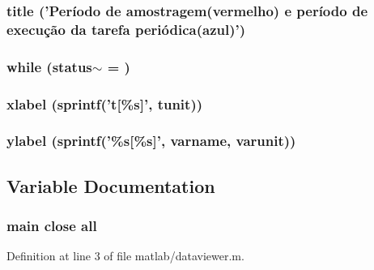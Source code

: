 \subsubsection[{title}]{\setlength{\rightskip}{0pt plus 5cm}title ('Período de amostragem(vermelho) e período de execução da tarefa periódica(azul)')}\label{matlab_2dataviewer_8m_a940de3a67cc5084676a7edc0ff0fb869}
\subsubsection[{while}]{\setlength{\rightskip}{0pt plus 5cm}while (status$\sim$ = {})}\label{matlab_2dataviewer_8m_a0df2ab0dd173ade3d8cab9219e4194c4}
\subsubsection[{xlabel}]{\setlength{\rightskip}{0pt plus 5cm}xlabel (sprintf('{\bf t}[\%s]', tunit))}\label{matlab_2dataviewer_8m_abfdbf47a6617364a73fa3a61e455c7f3}
\subsubsection[{ylabel}]{\setlength{\rightskip}{0pt plus 5cm}ylabel (sprintf('\%s[\%s]', varname, varunit))}\label{matlab_2dataviewer_8m_a457b37eaffd124d92fd274a5f5005282}


\subsection{Variable Documentation}
\subsubsection[{all}]{ main close {\bf all}}\label{matlab_2dataviewer_8m_aa352f5f080329b3d0104b863660b6340}


Definition at line 3 of file matlab/dataviewer.m.
